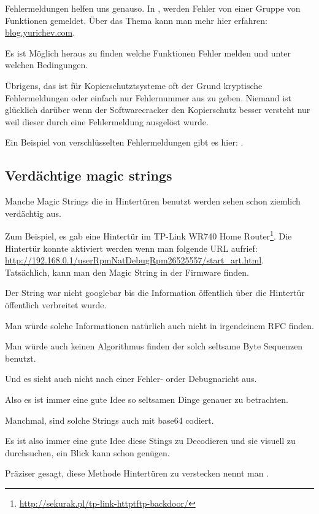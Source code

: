 Fehlermeldungen helfen uns genauso.
In \oracle, werden Fehler von einer Gruppe von Funktionen gemeldet.
\"Uber das Thema kann man mehr hier erfahren: \href{http://go.yurichev.com/17224}{blog.yurichev.com}.


Es ist M\"oglich heraus zu finden welche Funktionen Fehler melden und unter welchen Bedingungen.


\"Ubrigens, das ist f\"ur Kopierschutztsysteme oft der Grund kryptische Fehlermeldungen oder einfach nur 
Fehlernummer aus zu geben. Niemand ist gl\"ucklich dar\"uber wenn der Softwarecracker den Kopierschutz besser
versteht nur weil dieser durch eine Fehlermeldung ausgel\"ost wurde.

Ein Beispiel von verschl\"usselten Fehlermeldungen gibt es hier: .

\subsection{Verd\"achtige magic strings}

Manche Magic Strings die in Hintert\"uren benutzt werden sehen schon ziemlich verd\"achtig aus.

Zum Beispiel, es gab eine Hintert\"ur im TP-Link WR740 Home Router\footnote{\url{http://sekurak.pl/tp-link-httptftp-backdoor/}}.
Die Hintert\"ur konnte aktiviert werden wenn man folgende URL aufrief:
\url{http://192.168.0.1/userRpmNatDebugRpm26525557/start_art.html}.\\

Tats\"achlich, kann man den Magic String  in der Firmware finden.

Der String war nicht googlebar bis die Information \"offentlich \"uber die Hintert\"ur \"offentlich verbreitet wurde.


Man w\"urde solche Informationen nat\"urlich auch nicht in irgendeinem \ac{RFC} finden.


Man w\"urde auch keinen Algorithmus finden der solch seltsame Byte Sequenzen benutzt.


Und es sieht auch nicht nach einer Fehler- order Debugnaricht aus.


Also es ist immer eine gute Idee so seltsamen Dinge genauer zu betrachten.


Manchmal, sind solche Strings auch mit base64 codiert.

Es ist also immer eine gute Idee diese Stings zu Decodieren und sie visuell zu durchsuchen, ein Blick
kann schon gen\"ugen.

Pr\"aziser gesagt, diese Methode Hintert\"uren zu verstecken nennt man .
